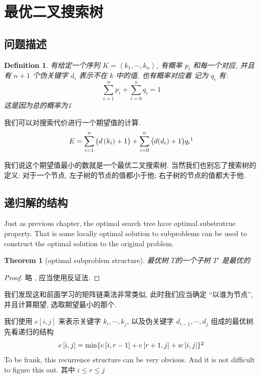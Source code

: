 \documentclass[a4paper, 10pt]{ctexart} %
\newtheorem{theorem}{Theorem}
\newtheorem{definition}{Definition}
\begin{document}
\section{最优二叉搜索树}
\subsection{问题描述}
\begin{definition}
有给定一个序列 $K = \left< k_1, \cdots ,k_n \right>$, 有概率 $p_{i}$ 和每一个对应,  
并且有 $n+1$ 个伪关键字 $d_i$ 表示不在 $k$ 中的值, 也有概率对应着 记为 $q_i$
有: 
\[
\sum_{i=1} ^{n}p_{i} + \sum_{i=0} ^{n}q_i = 1
\]
这是因为总的概率为1
\end{definition}

我们可以对搜索代价进行一个期望值的计算.
\[
E = \sum_{i=1} ^{n} \big(d \left(k_i\right) +1\big) + \sum_{i=0} ^{n} \big(d (d_i)+ 1 \big)  q_i\footnotemark
\]

我们说这个期望值最小的数就是一个最优二叉搜索树. 当然我们也别忘了搜索树的定义: 对于一个节点, 左子树的节点的值都小于他;
右子树的节点的值都大于他. 

\subsection{递归解的结构}
Just as previous chapter, the optimal 
search tree have optimal substrutrue property. 
That is some locally optimal 
solution to subproblems can be used to construct the optimal solution to the original problem.
\begin{theorem}[optimal subproblem structure]
最优树 $T$的一个子树 $T'$ 是最优的
\end{theorem}
\begin{proof}
    略  , 应当使用反证法.
\end{proof}

我们发现这和前面学习的矩阵链乘法非常类似, 此时我们应当确定 ``以谁为节点'', 并且计算期望, 选取期望最小的那个.

我们使用 $e \left[ i,j \right]$ 来表示关键字 $k_i , \cdots  , k_j$, 以及伪关键字 $d_{i-1}, \cdots  , d_{j}$ 组成的最优树. 
先看递归的结构 
\[
e \left[ i, j  \right] = \min \{e\left[ i,r-1 \right] + e \left[ r+1 ,j\right] +w \left[ i, j \right]\}\footnotemark
\]
To be frank, this recurrence structure can be very obvious. 
And it is not difficult to figure this out.
其中 $i \le r \le j$
\end{document}
